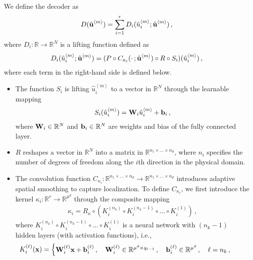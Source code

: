 We define the decoder as
\begin{align} \label{eq: cnn decoder}
    D(\hat{\textbf{u}}^{\left<m\right>}) = \sum_{i=1}^r D_i(\hat{u}_i^{\left<m\right>}; \hat{\textbf{u}}^{\left<m\right>})\,,
\end{align}
where $D_i: \mathbb{R} \to \mathbb{R}^N$ is a lifting function defined as
\begin{align} \label{eq: cnn sub decoder}
    D_i(\hat{u}_i^{\left<m\right>}; \hat{\textbf{u}}^{\left<m\right>}) = (P \circ C_{\kappa_i}( \cdot\,; \hat{\textbf{u}}^{\left<m\right>}) \circ R \circ S_i)(\hat{u}_i^{\left<m\right>})\,,
\end{align}
where each term in the right-hand side is defined below.
\begin{itemize}
    \item The function $S_i$ is lifting $\hat{u}_i^{\left<m\right>}$ to a vector in $\mathbb{R}^N$ through the learnable mapping
    \begin{align}
    S_i(\hat{u}_i^{\left<m\right>}) = \textbf{W}_i \hat{u}_i^{\left<m\right>} + \textbf{b}_i\,,
    \end{align}
    where $\textbf{W}_i \in \mathbb{R}^N$ and $\textbf{b}_i \in \mathbb{R}^N$ are weights and bias of the fully connected layer.
    \item $R$ reshapes a vector in $\mathbb{R}^N$ into a matrix in $\mathbb{R}^{n_1 \times \ldots \times n_d}$, where $n_i$ specifies the number of degrees of freedom along the $i$th direction in the physical domain.
    \item The convolution function $C_{\kappa_i}:\mathbb{R}^{n_1 \times \ldots \times n_d} \to \mathbb{R}^{n_1 \times \ldots \times n_d}$ introduces adaptive spatial smoothing to capture localization. To define $C_{\kappa_i}$, we first introduce the kernel $\kappa_i:\mathbb{R}^r \to \mathbb{R}^{\mu^d}$ through the composite mapping
    \begin{align}
    \kappa_i = R_\kappa \circ ( K_i^{(n_k)} \circ K_i^{(n_k -1)} \circ ... \circ K_i^{(1)})\,,
    \end{align}
    where $K_i^{(n_k)} \circ K_i^{(n_k -1)} \circ ... \circ K_i^{(1)}$ is a neural network with $(n_k-1)$ hidden layers (with activation functions), i.e.,
    \begin{align}
    K_i^{(\ell)}(\textbf{x}) &= 
    \begin{cases} 
        \textbf{W}^{(\ell)}_i \textbf{x} + \textbf{b}^{(\ell)}_i\,, \quad \textbf{W}^{(\ell)}_i \in \mathbb{R}^{\mu^d \times q_{\ell - 1}}\,, \quad \textbf{b}^{(\ell)}_i \in \mathbb{R}^{\mu^d}\,,\quad \ell = n_k\,,\\

\end{cases}
\end{align}
\end{itemize}
